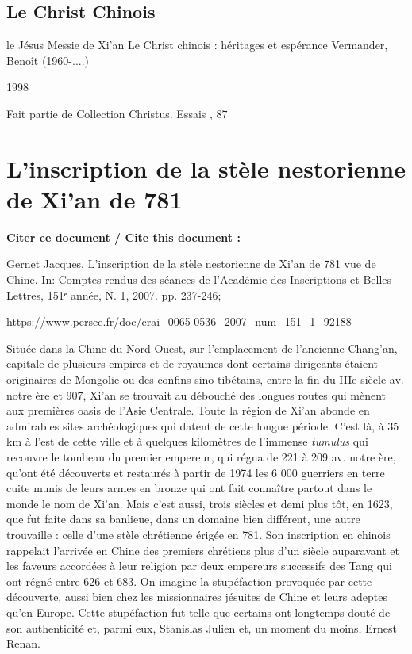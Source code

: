 \subsection{Le Christ Chinois}
le Jésus Messie de Xi'an
Le Christ chinois : héritages et espérance
Vermander, Benoît (1960-....)

1998

Fait partie de
Collection Christus. Essais , 87


\section{L'inscription de la stèle nestorienne de Xi'an de 781}


\textbf{Citer ce document / Cite this document :}

Gernet Jacques. L'inscription de la stèle nestorienne de Xi'an de 781
vue de Chine. In: Comptes rendus des séances de l'Académie des
Inscriptions et Belles-Lettres, 151ᵉ année, N. 1, 2007. pp. 237-246;

\url{https://www.persee.fr/doc/crai_0065-0536_2007_num_151_1_92188}
 


Située dans la Chine du Nord-Ouest, sur l'emplacement de l'ancienne
Chang'an, capitale de plusieurs empires et de royaumes dont certains
dirigeants étaient originaires de Mongolie ou des confins
sino-tibétains, entre la fin du IIIe siècle av. notre ère et 907, Xi'an
se trouvait au débouché des longues routes qui mènent aux premières
oasis de l'Asie Centrale. Toute la région de Xi'an abonde en admirables
sites archéologiques qui datent de cette longue période. C'est là, à 35
km à l'est de cette ville et à quelques kilomètres de l'immense
\emph{tumulus} qui recouvre le tombeau du premier empereur, qui régna de
221 à 209 av. notre ère, qu'ont été découverts et restaurés à partir de
1974 les 6 000 guerriers en terre cuite munis de leurs armes en bronze
qui ont fait connaître partout dans le monde le nom de Xi'an. Mais c'est
aussi, trois siècles et demi plus tôt, en 1623, que fut faite dans sa
banlieue, dans un domaine bien différent, une autre trouvaille : celle
d'une stèle chrétienne érigée en 781. Son inscription en chinois
rappelait l'arrivée en Chine des premiers chrétiens plus d'un siècle
auparavant et les faveurs accordées à leur religion par deux empereurs
successifs des Tang qui ont régné entre 626 et 683. On imagine la
stupéfaction provoquée par cette découverte, aussi bien chez les
missionnaires jésuites de Chine et leurs adeptes qu'en Europe. Cette
stupéfaction fut telle que certains ont longtemps douté de son
authenticité et, parmi eux, Stanislas Julien et, un moment du moins,
Ernest Renan.



